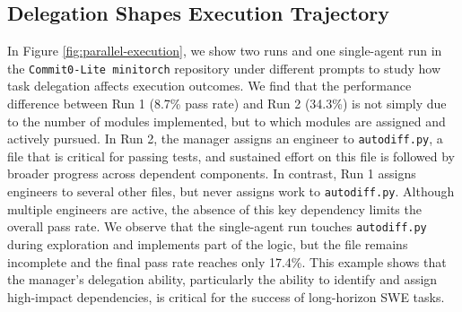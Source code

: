 \subsection{Delegation Shapes Execution Trajectory}
\label{sec:delegation}

In Figure \ref{fig:parallel-execution}, we show two \ourmethod runs and one single-agent run in the \texttt{Commit0-Lite minitorch} repository under different prompts to study how task delegation affects execution outcomes. We find that the performance difference between \ourmethod Run 1 (8.7\% pass rate) and \ourmethod Run 2 (34.3\%) is not simply due to the number of modules implemented, but to which modules are assigned and actively pursued. In Run 2, the manager assigns an engineer to \texttt{autodiff.py}, a file that is critical for passing tests, and sustained effort on this file is followed by broader progress across dependent components. In contrast, Run 1 assigns engineers to several other files, but never assigns work to \texttt{autodiff.py}. Although multiple engineers are active, the absence of this key dependency limits the overall pass rate. We observe that the single-agent run touches \texttt{autodiff.py} during exploration and implements part of the logic, but the file remains incomplete and the final pass rate reaches only 17.4\%. This example shows that the manager's delegation ability, particularly the ability to identify and assign high-impact dependencies, is critical for the success of long-horizon SWE tasks.


